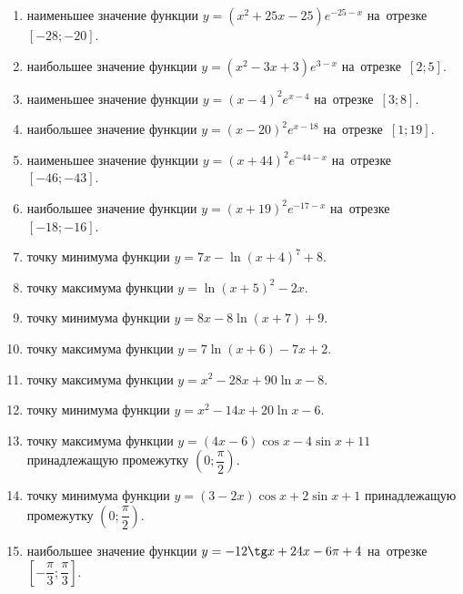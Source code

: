 \documentclass[a4paper,10pt]{article}
\begin{document}
\begin{enumerate}
\item {} наименьшее значение функции $y=\left(x^2 +25x -25\right)e^{-25-x}$ на~отрезке~$\left[-28;-20\right]$.

\item {} наибольшее значение функции $y=\left(x^2 -3x +3\right)e^{3-x}$ на~отрезке~$\left[2;5\right]$.

\item {} наименьшее значение функции $y=\left(x-4\right)^2e^{x-4}$ на~отрезке~$\left[3;8\right]$.

\item {} наибольшее значение функции $y=\left(x-20\right)^2e^{x-18}$ на~отрезке~$\left[1;19\right]$.

\item {} наименьшее значение функции $y=\left(x+44\right)^2e^{-44-x}$ на~отрезке~$\left[-46;-43\right]$.

\item {} наибольшее значение функции $y=\left(x+19\right)^2e^{-17-x}$ на~отрезке~$\left[-18;-16\right]$.

\item {} точку минимума функции $y=7x-\ln\left(x+4\right)^{7}+8$.

\item {} точку максимума функции $y=\ln\left(x+5\right)^{2}-2x$.

\item {} точку минимума функции $y=8x-8\ln\left(x+7\right)+9$.

\item {} точку максимума функции $y=7\ln\left(x+6\right)-7x+2$.

\item {} точку максимума функции $y=x^2-28x+90\ln x -8$.

\item {} точку минимума функции $y=x^2-14x+20\ln x -6$.

\item {} точку максимума функции $y=\left(4x-6\right)\cos x -4\sin x+11$
принадлежащую промежутку $\left(0;\dfrac{\pi}{2}\right)$.

\item {} точку минимума функции $y=\left(3-2x\right)\cos x +2\sin x+1$
принадлежащую промежутку $\left(0;\dfrac{\pi}{2}\right)$.

\item {} наибольшее значение функции $y=-12\tg x +24x-6\pi +4$ на~отрезке~$\left[-\dfrac{\pi}{3};\dfrac{\pi}{3}\right]$.


\end{enumerate}
\end{document}
